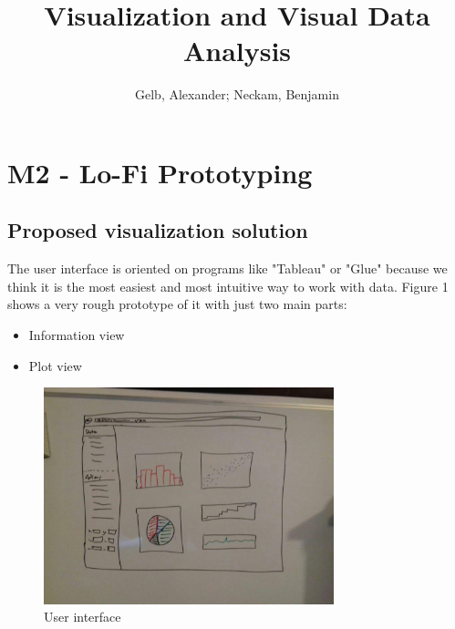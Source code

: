 \documentclass{article}
\begin{document}
\title{Visualization and Visual Data Analysis}
\author{Gelb, Alexander; Neckam, Benjamin}
\maketitle
\section{M2 - Lo-Fi Prototyping}
\subsection{Proposed visualization solution}
The user interface is oriented on programs like "Tableau" or "Glue" because we think it is the most easiest and most intuitive way to work with data. Figure 1 shows a very rough prototype of it with just two main parts:\\
\begin{itemize}
\item Information view
\item Plot view
\end{itemize}

\begin{figure}[!h]
\centering
    \includegraphics[width=0.75\textwidth]{images/Prototype1.jpg}
	\caption{User interface}
	\label{fig1}
\end{figure}
\end{document}

